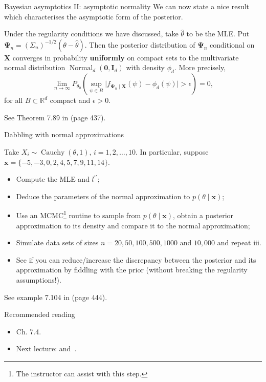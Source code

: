 \begin{frame}{Bayesian asymptotics II: asymptotic normality}
We can now state a nice result which characterises the asymptotic form of the posterior.
\begin{theo}
Under the regularity conditions we have discussed, take $\hat{\theta}$ to be the MLE.
Put $\boldsymbol{\Psi}_n = \left(\Sigma_n\right)^{-1/2}(\theta- \hat{\theta})$.
Then the posterior distribution of $\boldsymbol{\Psi}_n$ conditional on $\boldsymbol{X}$ converges in probability \textbf{uniformly} on compact sets to the multivariate normal distribution $\operatorname{Normal}_d\left(\boldsymbol{0}, \boldsymbol{I}_d\right)$ with density $\phi_d$.
More precisely,
\begin{equation*}
  \lim_{n \to \infty} P_{\theta_0}\left(\sup_{\psi \in B} \bigg\rvert f_{\boldsymbol{\Psi}_n \mid \boldsymbol{X}}(\psi) - \phi_d(\psi)  \bigg\lvert > \epsilon \right) = 0,
\end{equation*}
for all $B \subset \mathbb{R}^d$ compact and $\epsilon > 0$.
\end{theo}
See Theorem 7.89 in \cite{Schervish1995} (page 437).
\end{frame}
\begin{frame}{Dabbling with normal approximations}
\begin{exercise}
 Take $X_i \sim \operatorname{Cauchy}(\theta, 1)$, $i = 1, 2,\ldots, 10$.
 In particular, suppose $\boldsymbol{x} = \{-5, -3, 0, 2, 4, 5, 7, 9, 11, 14\}$.
 \begin{itemize}
  \item[i)] Compute the MLE and $l^{\prime\prime}$;
  \item[ii)] Deduce the parameters of the normal approximation to $p(\theta \mid \boldsymbol{x})$;
  \item[iii)] Use an MCMC\footnote{The instructor can assist with this step.} routine to sample from $p(\theta \mid \boldsymbol{x})$, obtain a posterior approximation to its density and compare it to the normal approximation;
  \item[iv)] Simulate data sets of sizes $n=20, 50, 100, 500, 1000$ and $10, 000$ and repeat iii.
  \item[v)] See if you can reduce/increase the discrepancy between the posterior and its approximation by fiddling with the prior (without breaking the regularity assumptions!).
 \end{itemize}
\end{exercise}
See example 7.104 in \cite{Schervish1995} (page 444).
 \end{frame}
\begin{frame}{Recommended reading}
\begin{itemize}
  \item[\faBook] \cite{Schervish1995} Ch. 7.4.
 \item[\faForward] Next lecture: \cite{Raftery1988} and~\cite{Gelman2002}.
 \end{itemize} 
\end{frame}
